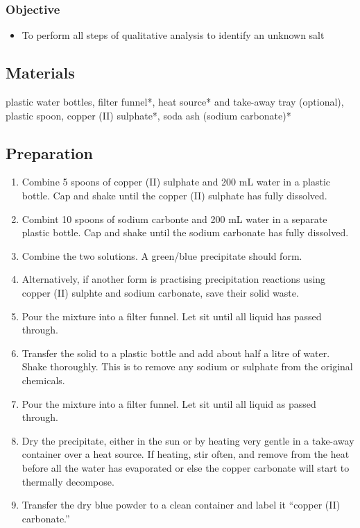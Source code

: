 \subsubsection{Objective}
\begin{itemize}
\item{To perform all steps of qualitative analysis to identify an unknown salt}
\end{itemize}

\subsection{Materials}
plastic water bottles, filter funnel*, heat source* and take-away tray (optional), plastic spoon, copper (II) sulphate*, soda ash (sodium carbonate)*

\subsection{Preparation}
\begin{enumerate}
\item{Combine 5 spoons of copper (II) sulphate and 200 mL water in a plastic bottle. Cap and shake until the copper (II) sulphate has fully dissolved.}
\item{Combint 10 spoons of sodium carbonte and 200 mL water in a separate plastic bottle. Cap and shake until the sodium carbonate has fully dissolved.}
\item{Combine the two solutions. A green/blue precipitate should form.}
\item{Alternatively, if another form is practising precipitation reactions using copper (II) sulphte and sodium carbonate, save their solid waste.}
\item{Pour the mixture into a filter funnel. Let sit until all liquid has passed through.}
\item{Transfer the solid to a plastic bottle and add about half a litre of water. Shake thoroughly. This is to remove any sodium or sulphate from the original chemicals.}
\item{Pour the mixture into a filter funnel. Let sit until all liquid as passed through.}
\item{Dry the precipitate, either in the sun or by heating very gentle in a take-away container over a heat source. If heating, stir often, and remove from the heat before all the water has evaporated or else the copper carbonate will start to thermally decompose.}
\item{Transfer the dry blue powder to a clean container and label it ``copper (II) carbonate.''}
\end{enumerate}

